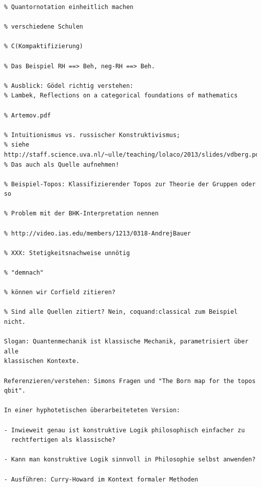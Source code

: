 \documentclass[a4paper,ngerman,12pt]{scrartcl}
\theoremstyle{definition}
\theoremstyle{plain}
\theoremstyle{remark}
\renewcommand{\_}{\mathpunct{.}\,}
\newcommand{\?}{\,{:}\,}
\begin{document}
\begin{verbatim}
% Quantornotation einheitlich machen

% verschiedene Schulen

% C(Kompaktifizierung)

% Das Beispiel RH ==> Beh, neg-RH ==> Beh.

% Ausblick: Gödel richtig verstehen:
% Lambek, Reflections on a categorical foundations of mathematics

% Artemov.pdf

% Intuitionismus vs. russischer Konstruktivismus;
% siehe http://staff.science.uva.nl/~ulle/teaching/lolaco/2013/slides/vdberg.pdf.
% Das auch als Quelle aufnehmen!

% Beispiel-Topos: Klassifizierender Topos zur Theorie der Gruppen oder so

% Problem mit der BHK-Interpretation nennen

% http://video.ias.edu/members/1213/0318-AndrejBauer

% XXX: Stetigkeitsnachweise unnötig

% "demnach"

% können wir Corfield zitieren?

% Sind alle Quellen zitiert? Nein, coquand:classical zum Beispiel nicht.

Slogan: Quantenmechanik ist klassische Mechanik, parametrisiert über alle
klassischen Kontexte.

Referenzieren/verstehen: Simons Fragen und "The Born map for the topos qbit".

In einer hyphotetischen überarbeiteteten Version:

- Inwieweit genau ist konstruktive Logik philosophisch einfacher zu
  rechtfertigen als klassische?

- Kann man konstruktive Logik sinnvoll in Philosophie selbst anwenden?

- Ausführen: Curry-Howard im Kontext formaler Methoden
\end{verbatim}
\end{document}
